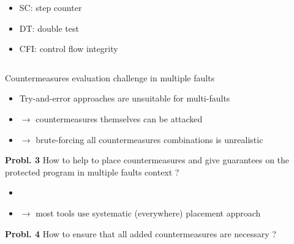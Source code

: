 \begin{frame}[fragile]
\begin{small}
\begin{tiny}
{\begin{columns}
\begin{column}{0.5\textwidth}
\begin{itemize}
                            \item SC: step counter
                            \item DT: double test
                            \item CFI: control flow integrity \cite{Lalande/ESORICS14}
                        \end{itemize}  
                    \end{column}
                \end{columns}  
            }
        \end{tiny}

    
    \vfill
    \end{small}
\end{frame}

\begin{frame}[fragile]{Countermeasures evaluation challenge in multiple faults}
\vfill
    {\small
        \begin{itemize}
            \item Try-and-error approaches are unsuitable for multi-faults
            \item[] $\rightarrow$ countermeasures themselves can be attacked
            \item [] $\rightarrow$ brute-forcing all countermeasures combinations is unrealistic
        \end{itemize}
    
        \begin{block}{
            \textbf{Probl. 3}}
            How to help to place countermeasures and give guarantees on the protected program in multiple faults context ?
        \end{block}
    
         {    
            \begin{itemize}
            \item[]
                \item $\rightarrow$ most tools use systematic (everywhere) placement approach
            \end{itemize}
            
            \begin{block}{\textbf{Probl. 4}}
            How to ensure that all added countermeasures are necessary ?
            \end{block}
        }
    }
\end{frame}

